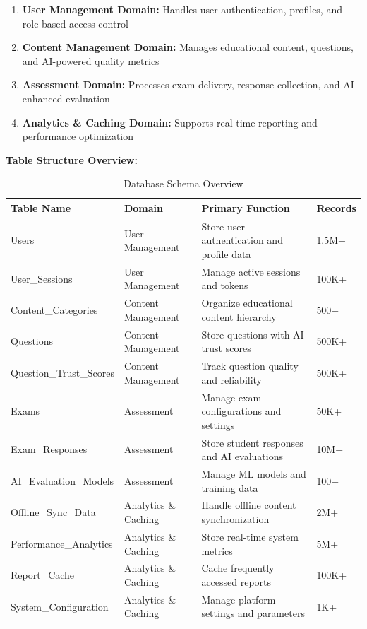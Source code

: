 \documentclass[12pt,a4paper,oneside]{book}
\begin{document}
\begin{enumerate}
    \item \textbf{User Management Domain:} Handles user authentication, profiles, and role-based access control
    \item \textbf{Content Management Domain:} Manages educational content, questions, and AI-powered quality metrics
    \item \textbf{Assessment Domain:} Processes exam delivery, response collection, and AI-enhanced evaluation
    \item \textbf{Analytics \& Caching Domain:} Supports real-time reporting and performance optimization
\end{enumerate}

\textbf{Table Structure Overview:}

\begin{table}[H]
\centering
\caption{Database Schema Overview}
\footnotesize
\begin{tabular}{|L{3.5cm}|L{2.5cm}|L{5cm}|L{1.5cm}|}
\hline
\textbf{Table Name} & \textbf{Domain} & \textbf{Primary Function} & \textbf{Records} \\
\hline
Users & User Management & Store user authentication and profile data & 1.5M+ \\
\hline
User\_Sessions & User Management & Manage active sessions and tokens & 100K+ \\
\hline
Content\_Categories & Content Management & Organize educational content hierarchy & 500+ \\
\hline
Questions & Content Management & Store questions with AI trust scores & 500K+ \\
\hline
Question\_Trust\_Scores & Content Management & Track question quality and reliability & 500K+ \\
\hline
Exams & Assessment & Manage exam configurations and settings & 50K+ \\
\hline
Exam\_Responses & Assessment & Store student responses and AI evaluations & 10M+ \\
\hline
AI\_Evaluation\_Models & Assessment & Manage ML models and training data & 100+ \\
\hline
Offline\_Sync\_Data & Analytics \& Caching & Handle offline content synchronization & 2M+ \\
\hline
Performance\_Analytics & Analytics \& Caching & Store real-time system metrics & 5M+ \\
\hline
Report\_Cache & Analytics \& Caching & Cache frequently accessed reports & 100K+ \\
\hline
System\_Configuration & Analytics \& Caching & Manage platform settings and parameters & 1K+ \\
\hline
\end{tabular}
\end{table}
\end{document}
